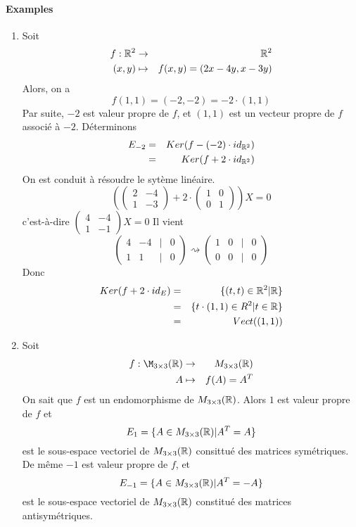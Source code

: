 \paragraph{Examples}
\begin{enumerate}
  \item Soit 
    \begin{eqnarray*}
      f: \mathbb{R}^2 &\rightarrow& \mathbb{R}^2 \\
      (x, y) &\mapsto& f(x, y) = (2x - 4 y, x -3 y)
    \end{eqnarray*}
    Alors, on a 
    $$f(1, 1) = (-2, -2) = -2 \cdot (1, 1)$$
    Par suite, $-2$ est valeur propre de $f$, et $(1, 1)$ est un vecteur propre de $f$ associé à $-2$. Déterminons 
    \begin{eqnarray*}
      E_{-2} &=& Ker(f-(-2)\cdot id_{\mathbb{R}^2} ) \\
        &=& Ker(f + 2 \cdot id_{\mathbb{R}^2})
    \end{eqnarray*}
    On est conduit à résoudre le sytème linéaire.
    $$\left(\begin{pmatrix}
        2 & -4 \\
        1 & -3
      \end{pmatrix} + 2 \cdot
      \begin{pmatrix}
        1 & 0 \\
        0 & 1
      \end{pmatrix} \right) X = 0$$
    c'est-à-dire $\begin{pmatrix} 4 & -4 \\ 1 & -1 \end{pmatrix} X = 0$ Il vient
    $$\begin{pmatrix} 4 & -4 & \vert & 0 \\ 1 & 1 & \vert & 0 \end{pmatrix} \rightsquigarrow \begin{pmatrix} 1 & 0 & \vert & 0 \\ 0 & 0 & \vert & 0 \end{pmatrix}$$
    Donc 
    \begin{eqnarray*}
      Ker(f + 2 \cdot id_E) &=& \{(t, t) \in \mathbb{R}^2 \vert \mathbb{R} \} \\
        &=& \{t \cdot (1, 1) \in R^2 \vert t \in \mathbb{R} \} \\
        &=& Vect((1, 1))
    \end{eqnarray*}
    
  \item Soit 
    \begin{eqnarray*}
      f: \M_{3 \times 3}(\R) &\rightarrow& M_{3 \times 3}(\R) \\
      A &\mapsto& f(A) = A^{T}
    \end{eqnarray*}
    On sait que $f$ est un endomorphisme de $M_{3 \times 3}(\mathbb{R})$. Alors $1$ est valeur propre de $f$ et
    $$E_{1} = \{A \in M_{3 \times 3}(\mathbb{R}) \vert A^{T} = A \}$$
    est le sous-espace vectoriel de $M_{3 \times 3}(\mathbb{R})$ consittué des matrices symétriques. \\
    De même $-1$ est valeur propre de $f$, et
    $$E_{-1} = \{A \in M_{3\times 3}(\mathbb{R}) \vert A^{T} = -A\}$$
    est le sous-espace vectoriel de $M_{3\times 3}(\mathbb{R})$ constitué des matrices antisymétriques.
    

\end{enumerate}
